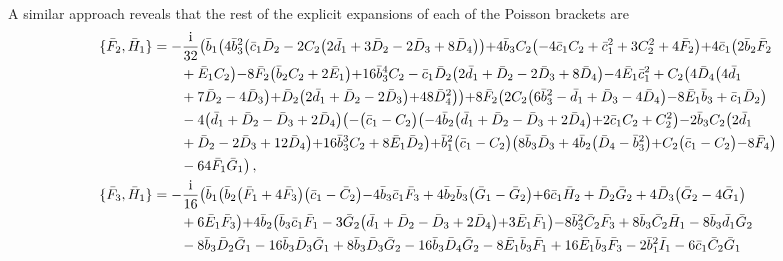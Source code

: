 \documentclass[10pt]{amsart}
\theoremstyle{definition}
\theoremstyle{corollary}
\theoremstyle{remark}
\theoremstyle{conclusion}
\begin{document}
A similar approach reveals that the rest of the explicit expansions of each of the Poisson brackets are  \begin{align}
	\{\bar{F}_2, \bar{H}_1\}&=-\frac{\rm i}{32}  \bigl(\bar{b}_1 \bigl(4 \bar{b}_3^2 \bigl(\bar{c}_1 \bar{D}_2-2 C_2 \bigl(2 \bar{d}_1+3 \bar{D}_2-2 \bar{D}_3+8 \bar{D}_4\bigl)\bigl)+4 \bar{b}_3 C_2 \bigl(-4 \bar{c}_1 C_2+\bar{c}_1^2+3 C_2^2+4 \bar{F}_2\bigl)+4 \bar{c}_1 \bigl(2 \bar{b}_2 \bar{F}_2 \nonumber\\
& \hskip 0.7cm	+\bar{E}_1 C_2\bigl)-8 \bar{F}_2 \bigl(\bar{b}_2 C_2+2 \bar{E}_1\bigl)+16 \bar{b}_3^4 C_2-\bar{c}_1 \bar{D}_2 \bigl(2 \bar{d}_1+\bar{D}_2-2 \bar{D}_3+8 \bar{D}_4\bigl)-4 \bar{E}_1 \bar{c}_1^2+C_2 \bigl(4 \bar{D}_4 \bigl(4 \bar{d}_1 \nonumber\\
& \hskip 0.7cm+7 \bar{D}_2-4 \bar{D}_3\bigl)+\bar{D}_2 \bigl(2 \bar{d}_1+\bar{D}_2-2 \bar{D}_3\bigl)+48 \bar{D}_4^2\bigl)\bigl)+8 \bar{F}_2 \bigl(2 C_2 \bigl(6 \bar{b}_3^2-\bar{d}_1+\bar{D}_3-4 \bar{D}_4\bigl)-8 \bar{E}_1 \bar{b}_3+\bar{c}_1 \bar{D}_2\bigl) \nonumber\\
& \hskip 0.7cm-4 \bigl(\bar{d}_1+\bar{D}_2-\bar{D}_3+2 \bar{D}_4\bigl) \bigl(-\bigl(\bar{c}_1-C_2\bigl) \bigl(-4 \bar{b}_2 \bigl(\bar{d}_1+\bar{D}_2-\bar{D}_3+2 \bar{D}_4\bigl)+2 \bar{c}_1 C_2+C_2^2\bigl)-2 \bar{b}_3 C_2 \bigl(2 \bar{d}_1 \nonumber\\
& \hskip 0.7cm+\bar{D}_2-2 \bar{D}_3+12 \bar{D}_4\bigl)+16 \bar{b}_3^3 C_2+8 \bar{E}_1 \bar{D}_2\bigl)+\bar{b}_1^2 \bigl(\bar{c}_1-C_2\bigl) \bigl(8 \bar{b}_3 \bar{D}_3+4 \bar{b}_2 \bigl(\bar{D}_4-\bar{b}_3^2\bigl)+C_2 \bigl(\bar{c}_1-C_2\bigl)-8 \bar{F}_4\bigl) \nonumber\\
& \hskip 0.7cm-64 \bar{F}_1 \bar{G}_1\bigl) \, , \nonumber\\
\{\bar{F}_3, \bar{H}_1\}&=-\frac{{\rm i}}{16}  \bigl(\bar{b}_1 \bigl(\bar{b}_2 \bigl(\bar{F}_1+4 \bar{F}_3\bigl) \bigl(\bar{c}_1-\bar{C}_2\bigl)-4 \bar{b}_3 \bar{c}_1 \bar{F}_3+4 \bar{b}_2 \bar{b}_3 \bigl(\bar{G}_1-\bar{G}_2\bigl)+6 \bar{c}_1 \bar{H}_2+\bar{D}_2 \bar{G}_2+4 \bar{D}_3 \bigl(\bar{G}_2-4 \bar{G}_1\bigl) \nonumber\\
& \hskip 0.7cm +6 \bar{E}_1 \bar{F}_3\bigl)+4 \bar{b}_2 \bigl(\bar{b}_3 \bar{c}_1 \bar{F}_1-3 \bar{G}_2 \bigl(\bar{d}_1+\bar{D}_2-\bar{D}_3+2 \bar{D}_4\bigl)+3 \bar{E}_1 \bar{F}_1\bigl)-8 \bar{b}_3^2 \bar{C}_2 \bar{F}_3+8 \bar{b}_3 \bar{C}_2 \bar{H}_1-8 \bar{b}_3 \bar{d}_1 \bar{G}_2 \nonumber\\
& \hskip 0.7cm-8 \bar{b}_3 \bar{D}_2 \bar{G}_1-16 \bar{b}_3 \bar{D}_3 \bar{G}_1+8 \bar{b}_3 \bar{D}_3 \bar{G}_2-16 \bar{b}_3 \bar{D}_4 \bar{G}_2-8 \bar{E}_1 \bar{b}_3 \bar{F}_1+16 \bar{E}_1 \bar{b}_3 \bar{F}_3-2 \bar{b}_1^2 \bar{I}_1-6 \bar{c}_1 \bar{C}_2 \bar{G}_1 \nonumber\\

\end{align}
\end{document}
